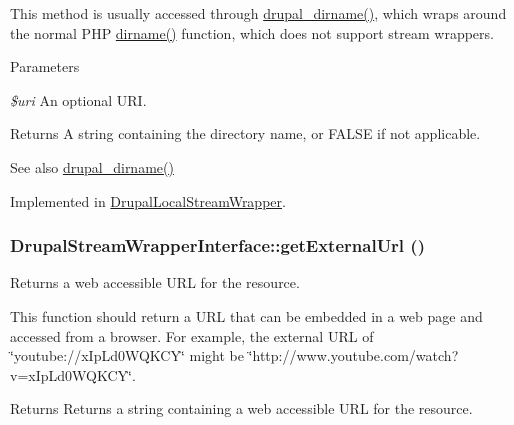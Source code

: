 This method is usually accessed through \hyperlink{group__php__wrappers_gad00418a5880c03f43e5eccfaa62863f6}{drupal\_\-dirname()}, which wraps around the normal PHP \hyperlink{interfaceDrupalStreamWrapperInterface_a4d189eb40075b3873752c7706e41aac6}{dirname()} function, which does not support stream wrappers.


\begin{DoxyParams}{Parameters}
\item[{\em \$uri}]An optional URI.\end{DoxyParams}
\begin{DoxyReturn}{Returns}
A string containing the directory name, or FALSE if not applicable.
\end{DoxyReturn}
\begin{DoxySeeAlso}{See also}
\hyperlink{group__php__wrappers_gad00418a5880c03f43e5eccfaa62863f6}{drupal\_\-dirname()} 
\end{DoxySeeAlso}


Implemented in \hyperlink{classDrupalLocalStreamWrapper_ab98ad39ce1745a24c760abf3e4297577}{DrupalLocalStreamWrapper}.\hypertarget{interfaceDrupalStreamWrapperInterface_af8474357b8c79f1a7629084a05541d16}{
\subsubsection[{getExternalUrl}]{\setlength{\rightskip}{0pt plus 5cm}DrupalStreamWrapperInterface::getExternalUrl ()}}
\label{interfaceDrupalStreamWrapperInterface_af8474357b8c79f1a7629084a05541d16}
Returns a web accessible URL for the resource.

This function should return a URL that can be embedded in a web page and accessed from a browser. For example, the external URL of \char`\"{}youtube://xIpLd0WQKCY\char`\"{} might be \char`\"{}http://www.youtube.com/watch?v=xIpLd0WQKCY\char`\"{}.

\begin{DoxyReturn}{Returns}
Returns a string containing a web accessible URL for the resource. 
\end{DoxyReturn}


